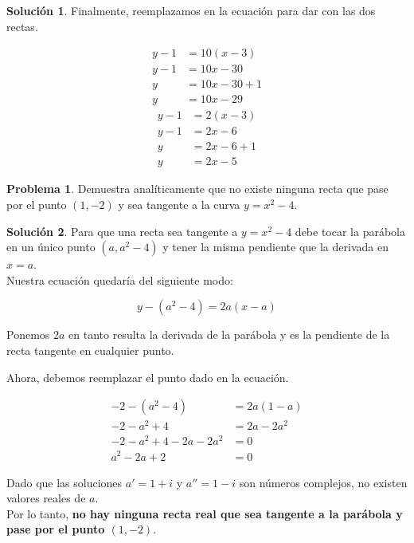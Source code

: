\documentclass{article}
\theoremstyle{definition}
\newtheorem{problem}{Problema}
\newtheorem*{solution}{Solución}
\begin{document}
\begin{solution}
Finalmente, reemplazamos en la ecuación para dar con las dos rectas.

\begin{align*}
    y - 1 &= 10(x-3) \\
    y - 1 &= 10x - 30 \\
    y &= 10x - 30 + 1 \\
    y &= 10x - 29
\end{align*}
\begin{align*}
    y - 1 &= 2(x-3) \\
    y - 1 &= 2x - 6 \\
    y &= 2x - 6 + 1 \\
    y &= 2x - 5
\end{align*}
\end{solution}

\bigskip

\begin{problem}
Demuestra analíticamente que no existe ninguna recta que pase por el punto \((1,-2)\) y sea tangente a la curva \( y = x^2 - 4 \).
\end{problem}

\begin{solution}
Para que una recta sea tangente a \( y=x^2-4 \) debe tocar  la parábola en un único punto \( (a, a^2-4) \) y tener la misma pendiente que la derivada en \( x=a \). \\

Nuestra ecuación quedaría del siguiente modo:

\[
y - (a^2-4) = 2a(x-a)
\]

Ponemos \( 2a \) en tanto resulta la derivada de la parábola y es la pendiente de la recta tangente en cualquier punto.

Ahora, debemos reemplazar el punto dado en la ecuación.

\begin{align*}
    -2 - (a^2-4) &= 2a(1-a) \\
    -2 - a^2 + 4 &= 2a - 2a^2 \\
    -2 - a^2 + 4 - 2a - 2a^2 &= 0 \\
    a^2 - 2a + 2 &= 0
\end{align*}

Dado que las soluciones \( a' = 1 + i \) y \( a'' = 1 - i \) son números complejos, no existen valores reales de \( a \). \\

Por lo tanto, \textbf{no hay ninguna recta real que sea tangente a la parábola y pase por el punto \( (1, -2) \)}.
\end{solution}
\end{document}
